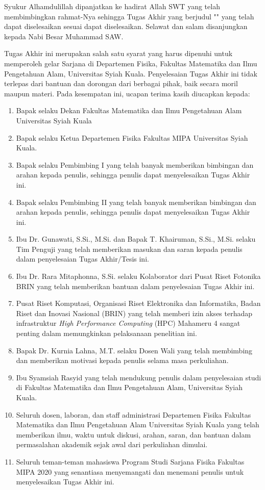 \preface %
\makeatletter
Syukur Alhamdulillah dipanjatkan ke hadirat Allah SWT yang telah membimbingkan rahmat-Nya sehingga Tugas Akhir yang berjudul "\textit{\@judul}" yang telah dapat diselesaikan sesuai dapat diselesaikan. Selawat dan salam disanjungkan kepada Nabi Besar Muhammad SAW.

Tugas Akhir ini merupakan salah satu syarat yang harus dipenuhi untuk memperoleh gelar Sarjana di Departemen Fisika, Fakultas Matematika dan Ilmu Pengetahuan Alam, Universitas Syiah Kuala. Penyelesaian Tugas Akhir ini tidak terlepas dari bantuan dan dorongan dari berbagai pihak, baik secara moril maupun materi. Pada kesempatan ini, ucapan terima kasih diucapkan kepada:

\begin{enumerate}
    \item Bapak \@dekan \textit{ }selaku Dekan Fakultas Matematika dan Ilmu Pengetahuan Alam Universitas Syiah Kuala
    \item Bapak \@kaprodi \textit{ }selaku Ketua Departemen Fisika Fakultas MIPA Universitas Syiah Kuala.
    \item Bapak \@firstsupervisor \textit{ }selaku  Pembimbing I yang telah banyak memberikan bimbingan dan arahan kepada penulis, sehingga penulis dapat menyelesaikan Tugas Akhir ini.
    \item Bapak \@secondsupervisor   \textit{ }selaku  Pembimbing II yang telah banyak memberikan bimbingan dan arahan kepada penulis, sehingga penulis dapat menyelesaikan Tugas Akhir ini.
    \item Ibu Dr. Gunawati, S.Si., M.Si. dan Bapak T. Khairuman, S.Si., M.Si. selaku Tim Penguji yang telah memberikan masukan dan saran kepada penulis dalam penyelesaian Tugas Akhir/Tesis ini.
    \item Ibu Dr. Rara Mitaphonna, S.Si. selaku Kolaborator dari Pusat Riset Fotonika BRIN yang telah memberikan bantuan dalam penyelesaian Tugas Akhir ini.
    \item Pusat Riset Komputasi, Organisasi Riset Elektronika dan Informatika, Badan Riset dan Inovasi Nasional (BRIN) yang telah memberi izin akses terhadap infrastruktur \textit{High Performance Computing} (HPC) Mahameru 4 sangat penting dalam memungkinkan pelaksanaan penelitian ini.
    
    \item Bapak Dr. Kurnia Lahna, M.T. selaku Dosen Wali yang telah membimbing dan memberikan motivasi kepada penulis selama masa perkuliahan.
    \item Ibu Syamsiah Rasyid yang telah mendukung penulis dalam penyelesaian studi di Fakultas Matematika dan Ilmu Pengetahuan Alam, Universitas Syiah Kuala.
    \item Seluruh dosen, laboran, dan staff administrasi Departemen Fisika Fakultas Matematika dan Ilmu Pengetahuan Alam Universitas Syiah Kuala yang telah memberikan ilmu, waktu untuk diskusi, arahan, saran, dan bantuan dalam permasalahan akademik sejak awal dari perkuliahan dimulai.
    \item Seluruh teman-teman mahasiswa Program Studi Sarjana Fisika Fakultas MIPA 2020 yang senantiasa menyemangati dan menemani penulis untuk menyelesaikan Tugas Akhir ini.
\end{enumerate}
